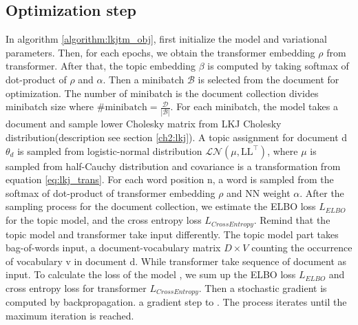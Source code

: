 \subsection{Optimization step}\label{ch4:3}
In algorithm \ref{algorithm:lkjtm_obj}, first initialize the model and variational parameters. Then, for each epochs, we obtain the transformer embedding $ \rho $ from transformer. After that, the topic embedding $ \beta $ is computed by taking softmax of dot-product of $ \rho $ and $ \alpha $. Then a minibatch $ \mathcal{B} $ is selected from the document for optimization. The number of minibatch is the document collection divides minibatch size where $ \#\text{minibatch}=\frac{\mathcal{D}}{|\mathcal{B}|} $. For each minibatch, the model takes a document and sample lower Cholesky matrix from LKJ Cholesky distribution(description see section \ref{ch2:lkj}). A topic assignment for document d $ \theta_d $ is sampled from logistic-normal distribution $ \mathcal{LN}(\mu,\text{LL}^\top) $, where $ \mu $ is sampled from half-Cauchy distribution and covariance is a transformation from equation \ref{eq:lkj_trans}. For each word position n, a word is sampled from the softmax of dot-product of transformer embedding $ \rho $ and NN weight $ \alpha $. After the sampling process for the document collection, we estimate the ELBO loss $ L_{ELBO} $ for the topic model, and the cross entropy loss $ L_{CrossEntropy} $. Remind that the topic model and transformer take input differently. The topic model part takes bag-of-words input, a document-vocabulary matrix $ D\times V $ counting the occurrence of vocabulary v in document d. While transformer take sequence of document as input. 
To calculate the loss of the model , we sum up the ELBO loss $ L_{ELBO} $ and cross entropy loss for transformer $ L_{CrossEntropy} $. Then a stochastic gradient is computed by backpropagation. a gradient step to . The process iterates until the maximum iteration is reached. 
\\
